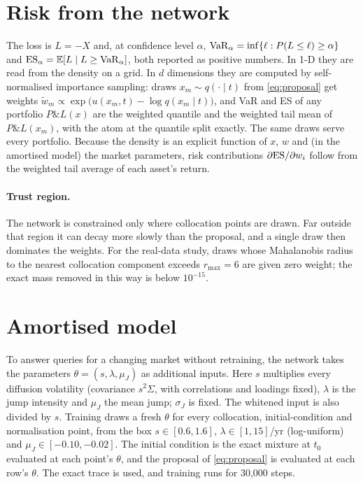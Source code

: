 \section{Risk from the network}
\label{sec:met-risk}

The loss is $L = -X$ and, at confidence level $\alpha$,
$\mathrm{VaR}_\alpha = \inf\{\ell : P(L \le \ell) \ge \alpha\}$ and $\mathrm{ES}_\alpha = \mathbb{E}[L \mid L \ge \mathrm{VaR}_\alpha]$,
both reported as positive numbers. In 1-D they are read from the density on a grid. In $d$ dimensions they are
computed by self-normalised importance sampling: draws $x_m \sim q(\cdot \mid t)$ from \cref{eq:proposal} get
weights $\tilde w_m \propto \exp\big(u(x_m,t) - \log q(x_m \mid t)\big)$, and VaR and ES of any portfolio
$P\&L(x)$ are the weighted quantile and the weighted tail mean of $P\&L(x_m)$, with the atom at the quantile
split exactly. The same draws serve every portfolio. Because the density is an explicit function of $x$, $w$
and (in the amortised model) the market parameters, risk contributions $\partial\mathrm{ES}/\partial w_i$ follow from
the weighted tail average of each asset's return.

\paragraph{Trust region.} The network is constrained only where collocation points are drawn. Far outside that
region it can decay more slowly than the proposal, and a single draw then dominates the weights. For the
real-data study, draws whose Mahalanobis radius to the nearest collocation component exceeds $r_{\max} = 6$ are
given zero weight; the exact mass removed in this way is below $10^{-15}$.

\section{Amortised model}
\label{sec:met-amortised}

To answer queries for a changing market without retraining, the network takes the parameters
$\theta = (s, \lambda, \mu_J)$ as additional inputs. Here $s$ multiplies every diffusion volatility
(covariance $s^2\Sigma$, with correlations and loadings fixed), $\lambda$ is the jump intensity and $\mu_J$
the mean jump; $\sigma_J$ is fixed. The whitened input is also divided by $s$. Training draws a fresh $\theta$
for every collocation, initial-condition and normalisation point, from the box $s \in [0.6, 1.6]$,
$\lambda \in [1, 15]$/yr (log-uniform) and $\mu_J \in [-0.10, -0.02]$. The initial condition is the exact mixture
at $t_0$ evaluated at each point's $\theta$, and the proposal of \cref{eq:proposal} is evaluated at each row's
$\theta$. The exact trace is used, and training runs for 30{,}000 steps.

